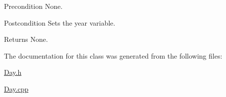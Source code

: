 \begin{DoxyPrecond}{Precondition}
None. 
\end{DoxyPrecond}
\begin{DoxyPostcond}{Postcondition}
Sets the year variable. 
\end{DoxyPostcond}
\begin{DoxyReturn}{Returns}
None. 
\end{DoxyReturn}


The documentation for this class was generated from the following files\-:\begin{DoxyCompactItemize}
\item 
\hyperlink{Day_8h}{Day.\-h}\item 
\hyperlink{Day_8cpp}{Day.\-cpp}\end{DoxyCompactItemize}
